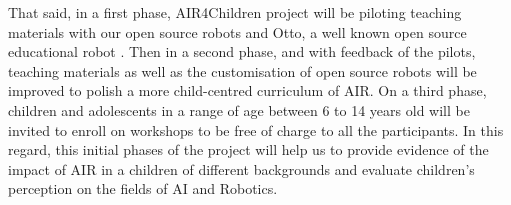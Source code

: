\documentclass[sigconf]{acmart}
\begin{document}
That said, in a first phase, AIR4Children project will be piloting teaching materials with our open source robots and Otto, a well known open source educational robot \cite{OttoDIY:2016}.  
Then in a second phase, and with feedback of the pilots, teaching materials as well as the customisation of open source robots will be improved to polish a more child-centred curriculum of AIR. 
On a third phase, children and adolescents in a range of age between 6 to 14 years old will be invited to enroll on workshops to be free of charge to all the participants. 
In this regard, this initial phases of the project will help us to provide evidence of the impact of AIR in a children of different backgrounds and evaluate children's perception on the fields of AI and Robotics.  




\end{document}
